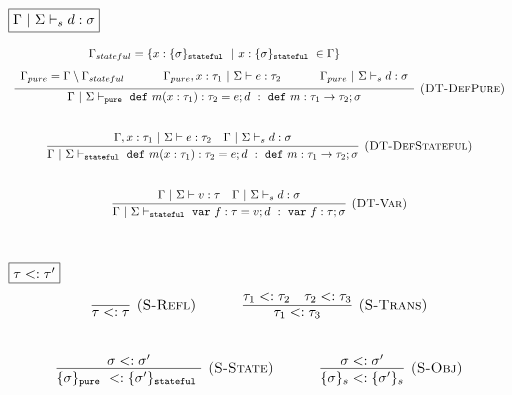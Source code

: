 \documentclass{llncs}
\newcommand{\keywadj}[1]{\mathtt{#1}}
\newcommand{\keyw}[1]{\keywadj{#1}~}
\begin{document}
$\fbox{$\Gamma~|~\Sigma \vdash_s d : \sigma$}$
\[
\begin{array}{c}

\infer[\textsc{(DT-DefPure)}]
  {\Gamma~|~\Sigma \vdash_{\keyw{pure}} \keyw{def} m(x : \tau_1) : \tau_2 = e; d~:~\keyw{def} m : \tau_1 \rightarrow \tau_2; \sigma}
  {\def\arraystretch{1.6}
  \begin{array}{c}
\Gamma_{stateful} = \{x : \{ \sigma \}_{\keyw{stateful}} ~|~ x : \{ \sigma \}_{\keyw{stateful}} \in \Gamma\} \\
\Gamma_{pure} = \Gamma \setminus \Gamma_{stateful}~~~~~~~~~~\Gamma_{pure}, x : \tau_1~|~\Sigma \vdash e : \tau_2~~~~~~~~~~\Gamma_{pure}~|~\Sigma \vdash_s d : \sigma
  \end{array}}\\[5ex]

\infer[\textsc{(DT-DefStateful)}]
  {\Gamma~|~\Sigma \vdash_{\keyw{stateful}} \keyw{def} m(x : \tau_1) : \tau_2 = e; d~:~\keyw{def} m : \tau_1 \rightarrow \tau_2; \sigma}
  {\Gamma, x : \tau_1~|~\Sigma \vdash e : \tau_2 & \Gamma~|~\Sigma \vdash_s d : \sigma}\\[5ex]

\infer[\textsc{(DT-Var)}]
  {\Gamma~|~\Sigma \vdash_{\keyw{stateful}} \keyw{var} f : \tau = v; d~:~\keyw{var} f : \tau; \sigma}
  {\Gamma~|~\Sigma \vdash v : \tau & \Gamma~|~\Sigma \vdash_s d : \sigma}\\[5ex]

\end{array}
\]

$\fbox{$\tau <: \tau'$}$
\[
\begin{array}{c}
\infer[\textsc{(S-Refl)}]
  {\tau <: \tau}
  {}%
~~~~~~~~~~
\infer[\textsc{(S-Trans)}]
  {\tau_1 <: \tau_3}
  {\tau_1 <: \tau_2 & \tau_2 <: \tau_3}\\[5ex]

\infer[\textsc{(S-State)}]
  {\{ \sigma \}_{\keyw{pure}} <: \{ \sigma' \}_{\keyw{stateful}}}
  {\sigma <: \sigma'}%
~~~~~~~~~~
\infer[\textsc{(S-Obj)}]
  {\{ \sigma \}_{s} <: \{ \sigma' \}_{s}}
  {\sigma <: \sigma'}\\[5ex]  

\end{array}
\]
\end{document}
